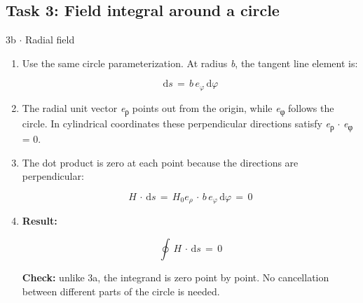 \documentclass[11pt]{article}
\begin{document}
\begin{keepsection}\subsection{Task 3: Field integral around a circle}

\begin{workedbox}{3b \ensuremath{\cdot} Radial field}
\begin{enumerate}
\item {}
Use the same circle parameterization. At radius \textit{b}, the tangent line element is:

\begin{equation*}\mathrm{d}{s}\, =\, {b\,e}_{φ}\, \mathrm{d}{φ}\end{equation*}
\item The radial unit vector \textit{e}\textsubscript{ρ} points out from the origin, while \textit{e}\textsubscript{φ} follows the circle. In cylindrical coordinates these perpendicular directions satisfy \textit{e}\textsubscript{ρ} \ensuremath{\cdot} \textit{e}\textsubscript{φ} = 0.
\item {}
The dot product is zero at each point because the directions are perpendicular:

\begin{equation*}{H}\, \cdot \, \mathrm{d}{s}\, =\, {H}_{0}{e}_{ρ}\, \cdot \, {b\,e}_{φ}\, \mathrm{d}{φ}\, =\, 0\end{equation*}
\item {}
\textbf{Result:}

\begin{equation*}\oint \, {H}\, \cdot \, \mathrm{d}{s}\, =\, 0\end{equation*}

\textbf{Check:} unlike 3a, the integrand is zero point by point. No cancellation between different parts of the circle is needed.
\end{enumerate}
\end{workedbox}

\end{keepsection}
\end{document}
